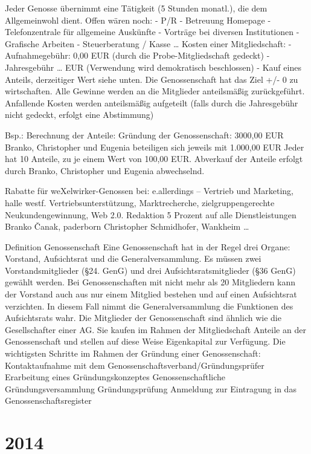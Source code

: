 Jeder Genosse übernimmt eine Tätigkeit (5 Stunden monatl.), die dem Allgemeinwohl dient. Offen wären noch:
- P/R
- Betreuung Homepage
- Telefonzentrale für allgemeine Auskünfte
- Vorträge bei diversen Institutionen
- Grafische Arbeiten
- Steuerberatung / Kasse
…
Kosten einer Mitgliedschaft:
- Aufnahmegebühr: 0,00 EUR (durch die Probe-Mitgliedschaft gedeckt)
- Jahresgebühr … EUR (Verwendung wird demokratisch beschlossen)
- Kauf eines Anteils, derzeitiger Wert siehe unten.
Die Genossenschaft hat das Ziel +/- 0 zu wirtschaften.
Alle Gewinne werden an die Mitglieder anteilsmäßig zurückgeführt.
Anfallende Kosten werden anteilsmäßig aufgeteilt (falls durch die Jahresgebühr nicht gedeckt, erfolgt eine Abstimmung)

Bsp.: Berechnung der Anteile:
Gründung der Genossenschaft: 3000,00 EUR
Branko, Christopher und Eugenia beteiligen sich jeweils mit 1.000,00 EUR
Jeder hat 10 Anteile, zu je einem Wert von 100,00 EUR.
Abverkauf der Anteile erfolgt durch Branko, Christopher und Eugenia abwechselnd.


Rabatte für weXelwirker-Genossen bei:
e.allerdings – Vertrieb und Marketing, halle westf.
Vertriebsunterstützung, Marktrecherche, zielgruppengerechte Neukundengewinnung, Web 2.0. Redaktion
5 Prozent auf alle Dienstleistungen
Branko Čanak, paderborn
Christopher Schmidhofer, Wankheim
…


 


Definition Genossenschaft
Eine Genossenschaft hat in der Regel drei Organe: Vorstand, Aufsichtsrat und die Generalversammlung. Es müssen zwei Vorstandsmitglieder (\S 24. GenG) und drei Aufsichtsratsmitglieder (\S 36 GenG) gewählt werden. Bei Genossenschaften mit nicht mehr als 20 Mitgliedern kann der Vorstand auch aus nur einem Mitglied bestehen und auf einen Aufsichtsrat verzichten. In diesem Fall nimmt die Generalversammlung die Funktionen des Aufsichtsrats wahr.
Die Mitglieder der Genossenschaft sind ähnlich wie die Gesellschafter einer AG. Sie kaufen im Rahmen der Mitgliedschaft Anteile an der Genossenschaft und stellen auf diese Weise Eigenkapital zur Verfügung.
Die wichtigsten Schritte im Rahmen der Gründung einer Genossenschaft:
Kontaktaufnahme mit dem Genossenschaftsverband/Gründungsprüfer
Erarbeitung eines Gründungskonzeptes
Genossenschaftliche Gründungsversammlung
Gründungsprüfung
Anmeldung zur Eintragung in das Genossenschaftsregister

  \section{2014}
